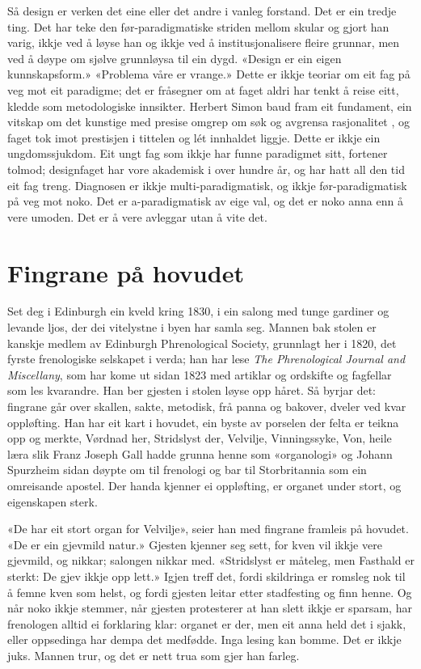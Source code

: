 Så design er verken det eine eller det andre i vanleg forstand. Det er ein tredje ting. Det har teke den før-paradigmatiske striden mellom skular og gjort han varig, ikkje ved å løyse han og ikkje ved å institusjonalisere fleire grunnar, men ved å døype om sjølve grunnløysa til ein dygd. «Design er ein eigen kunnskapsform.» «Problema våre er vrange.» Dette er ikkje teoriar om eit fag på veg mot eit paradigme; det er fråsegner om at faget aldri har tenkt å reise eitt, kledde som metodologiske innsikter. Herbert Simon baud fram eit fundament, ein vitskap om det kunstige med presise omgrep om søk og avgrensa rasjonalitet \autocite{simon1969sciences}, og faget tok imot prestisjen i tittelen og lét innhaldet liggje. Dette er ikkje ein ungdomssjukdom. Eit ungt fag som ikkje har funne paradigmet sitt, fortener tolmod; designfaget har vore akademisk i over hundre år, og har hatt all den tid eit fag treng. Diagnosen er ikkje multi-paradigmatisk, og ikkje før-paradigmatisk på veg mot noko. Det er a-paradigmatisk av eige val, og det er noko anna enn å vere umoden. Det er å vere avleggar utan å vite det.

\section{Fingrane på hovudet}

Set deg i Edinburgh ein kveld kring 1830, i ein salong med tunge gardiner og levande ljos, der dei vitelystne i byen har samla seg. Mannen bak stolen er kanskje medlem av Edinburgh Phrenological Society, grunnlagt her i 1820, det fyrste frenologiske selskapet i verda; han har lese \emph{The Phrenological Journal and Miscellany}, som har kome ut sidan 1823 med artiklar og ordskifte og fagfellar som les kvarandre. Han ber gjesten i stolen løyse opp håret. Så byrjar det: fingrane går over skallen, sakte, metodisk, frå panna og bakover, dveler ved kvar oppløfting. Han har eit kart i hovudet, ein byste av porselen der felta er teikna opp og merkte, Vørdnad her, Stridslyst der, Velvilje, Vinningssyke, Von, heile læra slik Franz Joseph Gall hadde grunna henne som «organologi» og Johann Spurzheim sidan døypte om til frenologi og bar til Storbritannia som ein omreisande apostel. Der handa kjenner ei oppløfting, er organet under stort, og eigenskapen sterk.

«De har eit stort organ for Velvilje», seier han med fingrane framleis på hovudet. «De er ein gjevmild natur.» Gjesten kjenner seg sett, for kven vil ikkje vere gjevmild, og nikkar; salongen nikkar med. «Stridslyst er måteleg, men Fasthald er sterkt: De gjev ikkje opp lett.» Igjen treff det, fordi skildringa er romsleg nok til å femne kven som helst, og fordi gjesten leitar etter stadfesting og finn henne. Og når noko ikkje stemmer, når gjesten protesterer at han slett ikkje er sparsam, har frenologen alltid ei forklaring klar: organet er der, men eit anna held det i sjakk, eller oppsedinga har dempa det medfødde. Inga lesing kan bomme. Det er ikkje juks. Mannen trur, og det er nett trua som gjer han farleg.


